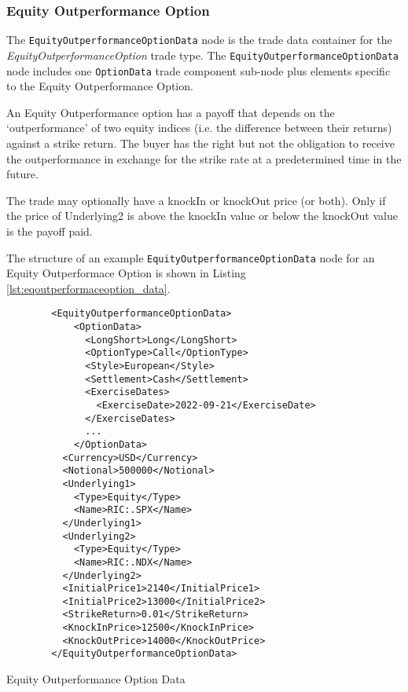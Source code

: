 \subsubsection{Equity Outperformance Option}

The \lstinline!EquityOutperformanceOptionData! node is the trade data container for the \emph{EquityOutperformanceOption} trade type. The \lstinline!EquityOutperformanceOptionData!  node includes one  \lstinline!OptionData! trade component sub-node plus elements
specific to the Equity Outperformance Option. 

An Equity Outperformance option has a payoff that depends on the `outperformance' of two equity indices (i.e. the difference between 
their returns) against a strike return. The buyer has the right but not the obligation to receive the outperformance in 
exchange for the strike rate at a predetermined time in the future.

The trade may optionally have a knockIn or knockOut price (or both). 
Only if the price of Underlying2 is above the knockIn value or below the knockOut value is the payoff paid.

The structure of an example \lstinline!EquityOutperformanceOptionData! node for an Equity Outperformace Option is shown in Listing
\ref{lst:eqoutperformaceoption_data}.

\begin{listing}[H]
\begin{verbatim}
        <EquityOutperformanceOptionData>
            <OptionData>
              <LongShort>Long</LongShort>
              <OptionType>Call</OptionType>
              <Style>European</Style>
              <Settlement>Cash</Settlement>
              <ExerciseDates>
                <ExerciseDate>2022-09-21</ExerciseDate>
              </ExerciseDates>
              ...
            </OptionData>
          <Currency>USD</Currency>
          <Notional>500000</Notional>
          <Underlying1>
            <Type>Equity</Type>
            <Name>RIC:.SPX</Name>
          </Underlying1>
          <Underlying2>
            <Type>Equity</Type>
            <Name>RIC:.NDX</Name>
          </Underlying2>
          <InitialPrice1>2140</InitialPrice1>
          <InitialPrice2>13000</InitialPrice2>
          <StrikeReturn>0.01</StrikeReturn>
          <KnockInPrice>12500</KnockInPrice>
          <KnockOutPrice>14000</KnockOutPrice>
        </EquityOutperformanceOptionData>
\end{verbatim}
\caption{Equity Outperformance Option Data}
\label{lst:eqoutperformaceoption_data}
\end{listing}

